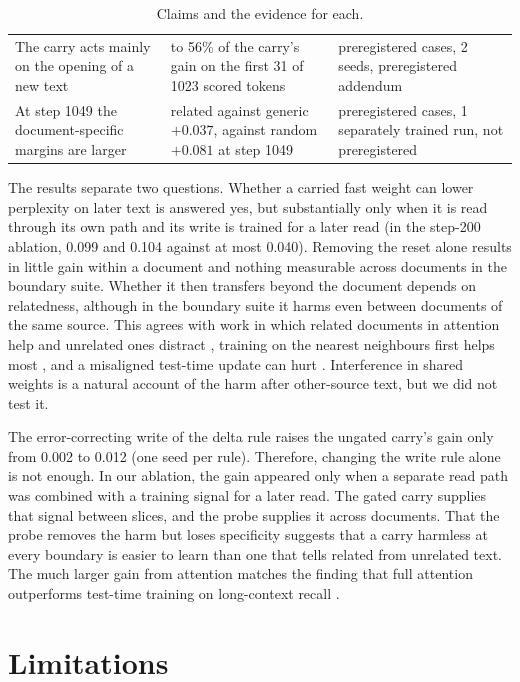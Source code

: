 \documentclass[12pt,a4paper]{report}
\begin{document}
\begin{table}[H]
\begin{tabularx}{\linewidth}{>{\raggedright\arraybackslash}p{4.6cm}>{\raggedright\arraybackslash}X>{\raggedright\arraybackslash}p{2.6cm}}
    The carry acts mainly on the opening of a new text & 54 to 56\% of the carry's gain on the first 31 of 1023 scored tokens & 200 preregistered cases, 2 seeds, preregistered addendum \\
    At step 1049 the document-specific margins are larger & related against generic $+0.037$, against random $+0.081$ at step 1049 & 200 preregistered cases, 1 separately trained run, not preregistered \\
    \bottomrule
  \end{tabularx}
    \caption{Claims and the evidence for each.}
  \label{tab-claims}
\end{table}

The results separate two questions. Whether a carried fast weight can lower perplexity on later text is answered yes, but substantially only when it is read through its own path and its write is trained for a later read (in the step-200 ablation, 0.099 and 0.104 against at most 0.040). Removing the reset alone results in little gain within a document and nothing measurable across documents in the boundary suite. Whether it then transfers beyond the document depends on relatedness, although in the boundary suite it harms even between documents of the same source. This agrees with work in which related documents in attention help and unrelated ones distract \citep{zhao2024analysing}, training on the nearest neighbours first helps most \citep{hardt2024test}, and a misaligned test-time update can hurt \citep{gandelsman2022ttt}. Interference in shared weights \citep{french1999catastrophic,kirkpatrick2017overcoming} is a natural account of the harm after other-source text, but we did not test it.

The error-correcting write of the delta rule \citep{schlag2021linear,yang2024deltanet} raises the ungated carry's gain only from 0.002 to 0.012 (one seed per rule). Therefore, changing the write rule alone is not enough. In our ablation, the gain appeared only when a separate read path was combined with a training signal for a later read. The gated carry supplies that signal between slices, and the probe supplies it across documents. That the probe removes the harm but loses specificity suggests that a carry harmless at every boundary is easier to learn than one that tells related from unrelated text. The much larger gain from attention matches the finding that full attention outperforms test-time training on long-context recall \citep{tandon2025endtoend}.

\section{Limitations}
\end{document}
